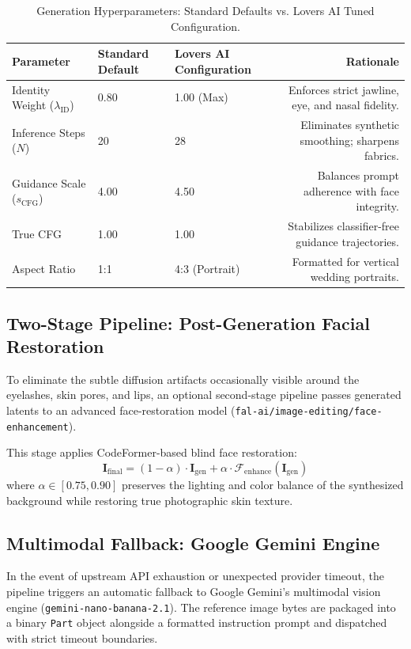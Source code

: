 \documentclass[11pt,a4paper]{article}
\begin{document}
\begin{table}[htbp]
\centering
\caption{Generation Hyperparameters: Standard Defaults vs. Lovers AI Tuned Configuration.}
\label{tab:hyperparams}
\begin{tabularx}{\textwidth}{lXXr}
\toprule
\textbf{Parameter} & \textbf{Standard Default} & \textbf{Lovers AI Configuration} & \textbf{Rationale} \\
\midrule
Identity Weight ($\lambda_{\text{ID}}$) & 0.80 & 1.00 (Max) & Enforces strict jawline, eye, and nasal fidelity. \\
Inference Steps ($N$) & 20 & 28 & Eliminates synthetic smoothing; sharpens fabrics. \\
Guidance Scale ($s_{\text{CFG}}$) & 4.00 & 4.50 & Balances prompt adherence with face integrity. \\
True CFG & 1.00 & 1.00 & Stabilizes classifier-free guidance trajectories. \\
Aspect Ratio & 1:1 & 4:3 (Portrait) & Formatted for vertical wedding portraits. \\
\bottomrule
\end{tabularx}
\end{table}

\subsection{Two-Stage Pipeline: Post-Generation Facial Restoration}
To eliminate the subtle diffusion artifacts occasionally visible around the eyelashes, skin pores, and lips, an optional second-stage pipeline passes generated latents to an advanced face-restoration model (\texttt{fal-ai/image-editing/face-enhancement}). 

This stage applies CodeFormer-based blind face restoration:
\begin{equation}
    \mathbf{I}_{\text{final}} = (1 - \alpha) \cdot \mathbf{I}_{\text{gen}} + \alpha \cdot \mathcal{F}_{\text{enhance}}(\mathbf{I}_{\text{gen}})
\end{equation}
where $\alpha \in [0.75, 0.90]$ preserves the lighting and color balance of the synthesized background while restoring true photographic skin texture.

\subsection{Multimodal Fallback: Google Gemini Engine}
In the event of upstream API exhaustion or unexpected provider timeout, the pipeline triggers an automatic fallback to Google Gemini's multimodal vision engine (\texttt{gemini-nano-banana-2.1}). The reference image bytes are packaged into a binary \texttt{Part} object alongside a formatted instruction prompt and dispatched with strict timeout boundaries.
\end{document}
